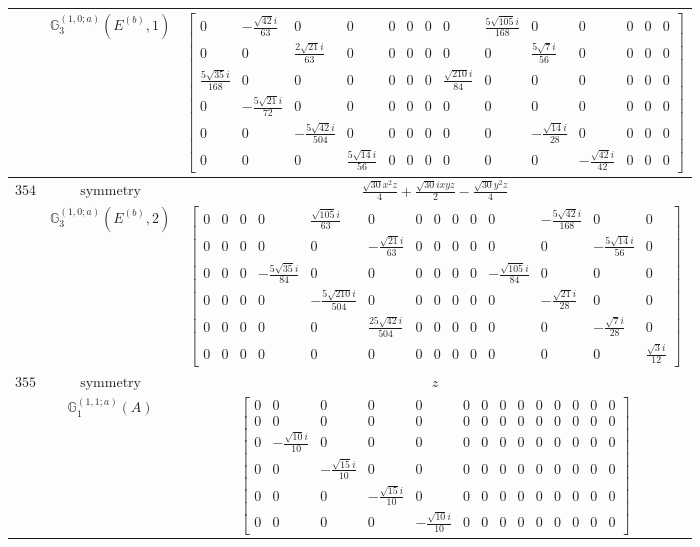 \documentclass[fleqn,8pt,landscape]{jsarticle}
\begin{document}
\begin{longtable}{ccc}
$  $ & $ \mathbb{G}_{3}^{(1,0;a)}(E^{(b)},1) $ & $ \begin{bmatrix} 0 & - \frac{\sqrt{42} i}{63} & 0 & 0 & 0 & 0 & 0 & 0 & \frac{5 \sqrt{105} i}{168} & 0 & 0 & 0 & 0 & 0 \\ 0 & 0 & \frac{2 \sqrt{21} i}{63} & 0 & 0 & 0 & 0 & 0 & 0 & \frac{5 \sqrt{7} i}{56} & 0 & 0 & 0 & 0 \\ \frac{5 \sqrt{35} i}{168} & 0 & 0 & 0 & 0 & 0 & 0 & \frac{\sqrt{210} i}{84} & 0 & 0 & 0 & 0 & 0 & 0 \\ 0 & - \frac{5 \sqrt{21} i}{72} & 0 & 0 & 0 & 0 & 0 & 0 & 0 & 0 & 0 & 0 & 0 & 0 \\ 0 & 0 & - \frac{5 \sqrt{42} i}{504} & 0 & 0 & 0 & 0 & 0 & 0 & - \frac{\sqrt{14} i}{28} & 0 & 0 & 0 & 0 \\ 0 & 0 & 0 & \frac{5 \sqrt{14} i}{56} & 0 & 0 & 0 & 0 & 0 & 0 & - \frac{\sqrt{42} i}{42} & 0 & 0 & 0 \end{bmatrix} $ \\ \hline
$ 354 $ & $ \text{symmetry} $ & $ \frac{\sqrt{30} x^{2} z}{4} + \frac{\sqrt{30} i x y z}{2} - \frac{\sqrt{30} y^{2} z}{4} $ \\
$  $ & $ \mathbb{G}_{3}^{(1,0;a)}(E^{(b)},2) $ & $ \begin{bmatrix} 0 & 0 & 0 & 0 & \frac{\sqrt{105} i}{63} & 0 & 0 & 0 & 0 & 0 & 0 & - \frac{5 \sqrt{42} i}{168} & 0 & 0 \\ 0 & 0 & 0 & 0 & 0 & - \frac{\sqrt{21} i}{63} & 0 & 0 & 0 & 0 & 0 & 0 & - \frac{5 \sqrt{14} i}{56} & 0 \\ 0 & 0 & 0 & - \frac{5 \sqrt{35} i}{84} & 0 & 0 & 0 & 0 & 0 & 0 & - \frac{\sqrt{105} i}{84} & 0 & 0 & 0 \\ 0 & 0 & 0 & 0 & - \frac{5 \sqrt{210} i}{504} & 0 & 0 & 0 & 0 & 0 & 0 & - \frac{\sqrt{21} i}{28} & 0 & 0 \\ 0 & 0 & 0 & 0 & 0 & \frac{25 \sqrt{42} i}{504} & 0 & 0 & 0 & 0 & 0 & 0 & - \frac{\sqrt{7} i}{28} & 0 \\ 0 & 0 & 0 & 0 & 0 & 0 & 0 & 0 & 0 & 0 & 0 & 0 & 0 & \frac{\sqrt{3} i}{12} \end{bmatrix} $ \\ \hline
$ 355 $ & $ \text{symmetry} $ & $ z $ \\
$  $ & $ \mathbb{G}_{1}^{(1,1;a)}(A) $ & $ \begin{bmatrix} 0 & 0 & 0 & 0 & 0 & 0 & 0 & 0 & 0 & 0 & 0 & 0 & 0 & 0 \\ 0 & 0 & 0 & 0 & 0 & 0 & 0 & 0 & 0 & 0 & 0 & 0 & 0 & 0 \\ 0 & - \frac{\sqrt{10} i}{10} & 0 & 0 & 0 & 0 & 0 & 0 & 0 & 0 & 0 & 0 & 0 & 0 \\ 0 & 0 & - \frac{\sqrt{15} i}{10} & 0 & 0 & 0 & 0 & 0 & 0 & 0 & 0 & 0 & 0 & 0 \\ 0 & 0 & 0 & - \frac{\sqrt{15} i}{10} & 0 & 0 & 0 & 0 & 0 & 0 & 0 & 0 & 0 & 0 \\ 0 & 0 & 0 & 0 & - \frac{\sqrt{10} i}{10} & 0 & 0 & 0 & 0 & 0 & 0 & 0 & 0 & 0 \end{bmatrix} $ \\ \hline

\end{longtable}
\end{document}

